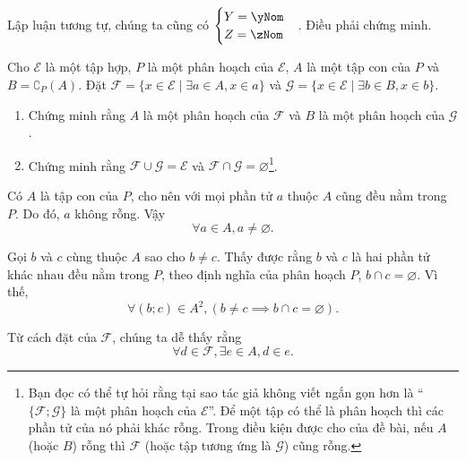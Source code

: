 Lập luận tương tự, chúng ta cũng có $\begin{cases}
   Y = \yNom \\
   Z = \zNom
\end{cases}$. Điều phải chứng minh.

\exercise Cho $\mathscr{E}$ là một tập hợp, $P$ là một phân hoạch của $\mathscr{E}$, $A$ là một tập con của $P$ và $B = \complement_P(A)$. Đặt $\mathscr{F} = \{x \in \mathscr{E} \mid \exists a \in A, x \in a\}$ và $\mathscr{G} = \{x \in \mathscr{E} \mid \exists b \in B, x \in b\}$.
\begin{enumerate}
   \item Chứng minh rằng $A$ là một phân hoạch của $\mathscr{F}$ và $B$ là một phân hoạch của $\mathscr{G}$.
   \item Chứng minh rằng $\mathscr{F} \cup \mathscr{G} = \mathscr{E}$ và $\mathscr{F} \cap \mathscr{G} = \varnothing$\footnote{Bạn đọc có thể tự hỏi rằng tại sao tác giả không viết ngắn gọn hơn là ``$\{\mathscr{F}; \mathscr{G}\}$ là một phân hoạch của $\mathscr{E}$''. Để một tập có thể là phân hoạch thì các phần tử của nó phải khác rỗng. Trong điều kiện được cho của đề bài, nếu $A$ (hoặc $B$) rỗng thì $\mathscr{F}$ (hoặc tập tương ứng là $\mathscr{G}$) cũng rỗng.}. 
\end{enumerate}

\solution

\resetSubexercise Có $A$ là tập con của $P$, cho nên với mọi phần tử $a$ thuộc $A$ cũng đều nằm trong $P$. Do đó, $a$ không rỗng. Vậy
\begin{equation}
   \forall a \in A, a \neq \varnothing.
   \label{eq:li_thuyet_tap_hop:tien_de:tien_de_tach:dk_khong_rong}
\end{equation}

Gọi $b$ và $c$ cùng thuộc $A$ sao cho $b \neq c$. Thấy được rằng $b$ và $c$ là hai phần tử khác nhau đều nằm trong $P$, theo định nghĩa của phân hoạch $P$, $b \cap c = \varnothing$. Vì thế,
\begin{equation}
   \forall (b; c) \in A^2, (b \neq c \implies b \cap c = \varnothing).
   \label{eq:li_thuyet_tap_hop:tien_de:tien_de_tach:dk_khong_giao}
\end{equation}

Từ cách đặt của $\mathscr{F}$, chúng ta dễ thấy rằng 
\begin{equation}
   \forall d \in \mathscr{F}, \exists e \in A, d \in e.
   \label{eq:li_thuyet_tap_hop:tien_de:tien_de_tach:dk_thuoc}
\end{equation}

